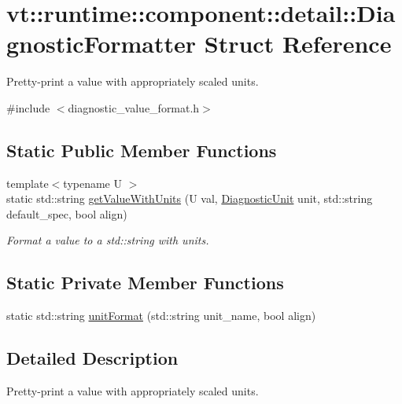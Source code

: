 \hypertarget{structvt_1_1runtime_1_1component_1_1detail_1_1_diagnostic_formatter}{}\section{vt\+:\+:runtime\+:\+:component\+:\+:detail\+:\+:Diagnostic\+Formatter Struct Reference}
\label{structvt_1_1runtime_1_1component_1_1detail_1_1_diagnostic_formatter}


Pretty-\/print a value with appropriately scaled units.  




{\ttfamily \#include $<$diagnostic\+\_\+value\+\_\+format.\+h$>$}

\subsection*{Static Public Member Functions}
\begin{DoxyCompactItemize}
\item 
{\footnotesize template$<$typename U $>$ }\\static std\+::string \hyperlink{structvt_1_1runtime_1_1component_1_1detail_1_1_diagnostic_formatter_a24baf1566933db8e7e65944e75549a5d}{get\+Value\+With\+Units} (U val, \hyperlink{namespacevt_1_1runtime_1_1component_a99ec18b08862c712176126bb7d0e307a}{Diagnostic\+Unit} unit, std\+::string default\+\_\+spec, bool align)
\begin{DoxyCompactList}\small\item\em Format a value to a {\ttfamily std\+::string} with units. \end{DoxyCompactList}\end{DoxyCompactItemize}
\subsection*{Static Private Member Functions}
\begin{DoxyCompactItemize}
\item 
static std\+::string \hyperlink{structvt_1_1runtime_1_1component_1_1detail_1_1_diagnostic_formatter_af336eb2cb4fd2a53650cc8aa70ddc7fb}{unit\+Format} (std\+::string unit\+\_\+name, bool align)
\end{DoxyCompactItemize}


\subsection{Detailed Description}
Pretty-\/print a value with appropriately scaled units. 



